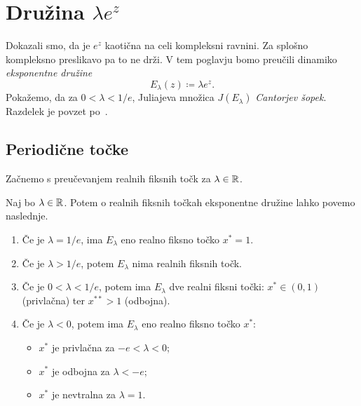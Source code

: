 \section{Družina \texorpdfstring{\(\lambda e^z\)}{lambda exp (z)}}

Dokazali smo, da je \(e^z\) kaotična na celi kompleksni ravnini. Za splošno kompleksno preslikavo pa to ne drži. V tem poglavju bomo preučili dinamiko \emph{eksponentne družine}
\[E_\lambda (z) \coloneq \lambda e^z.\]
Pokažemo, da za \(0 < \lambda < 1/e\), Juliajeva množica \(J (E_\lambda)\) \emph{Cantorjev šopek}. Razdelek je povzet po~\cite[razdelek 9]{Pineiro_2025}.

\subsection{Periodične točke}

Začnemo s preučevanjem realnih fiksnih točk za \(\lambda \in \mathbb R\).

\begin{trditev}
    Naj bo \(\lambda \in \mathbb R\). Potem o realnih fiksnih točkah eksponentne družine lahko povemo naslednje.
    \begin{enumerate}[label=(\arabic*)]
        \item Če je \(\lambda = 1/e\), ima \(E_\lambda\) eno realno fiksno točko \(x^* = 1\).
        \item Če je \(\lambda > 1/e\), potem \(E_\lambda\) nima realnih fiksnih točk.
        \item Če je \(0 < \lambda < 1/e\), potem ima \(E_\lambda\) dve realni fiksni točki: \(x^* \in (0, 1)\) (privlačna) ter \(x^{**} > 1\) (odbojna).
        \item Če je \(\lambda < 0\), potem ima \(E_\lambda\) eno realno fiksno točko \(x^*\):
            \begin{itemize}
                \item \(x^*\) je privlačna za \(-e < \lambda < 0\);
                \item \(x^*\) je odbojna za \(\lambda < -e\);
                \item \(x^*\) je nevtralna za \(\lambda = 1\).
            \end{itemize}
    \end{enumerate}
\end{trditev}

